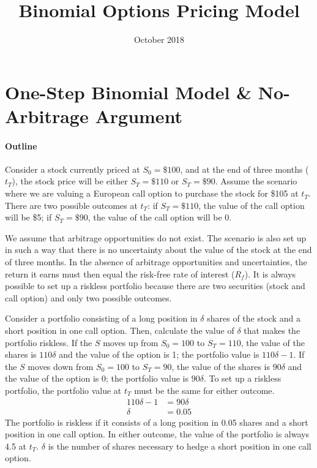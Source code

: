 \documentclass[12pt]{article}
\title{Binomial Options Pricing Model}
\date{October 2018}
\begin{document}
\begin{titlepage}
\maketitle
\end{titlepage}

\section{One-Step Binomial Model \& No-Arbitrage Argument}
\paragraph{Outline} \hspace{0pt}

Consider a stock currently priced at $S_{0}=\text{\$100}$, and at the end of three months ($t_{T}$), the stock price will be either $S_{T}=\text{\$110}$ or $S_{T}=\text{\$90}$. Assume the scenario where we are valuing a European call option to purchase the stock for \$105 at $t_{T}$. There are two possible outcomes at $t_{T}$: if $S_{T}=\text{\$110}$, the value of the call option will be \$5; if $S_{T}=\text{\$90}$, the value of the call option will be 0.

We assume that arbitrage opportunities do not exist. The scenario is also set up in such a way that there is no uncertainty about the value of the stock at the end of three months. In the absence of arbitrage opportunities and uncertainties, the return it earns must then equal the risk-free rate of interest ($R_{f}$). It is always possible to set up a riskless portfolio because there are two securities (stock and call option) and only two possible outcomes.

Consider a portfolio consisting of a long position in $\delta$ shares of the stock and a short position in one call option. Then, calculate the value of $\delta$ that makes the portfolio riskless. If the $S$ moves up from $S_{0}=100$ to $S_{T}=110$, the value of the shares is $110\delta$ and the value of the option is 1; the portfolio value is $110\delta-1$. If the $S$ moves down from $S_{0}=100$ to $S_{T}=90$, the value of the shares is $90\delta$ and the value of the option is 0; the portfolio value is $90\delta$. To set up a riskless portfolio, the portfolio value at $t_{T}$ must be the same for either outcome.
\begin{align*}
110\delta-1&=90\delta\\
\delta&=0.05
\end{align*}
The portfolio is riskless if it consists of a long position in 0.05 shares and a short position in one call option. In either outcome, the value of the portfolio is always 4.5 at $t_{T}$. $\delta$ is the number of shares necessary to hedge a short position in one call option.
\end{document}
